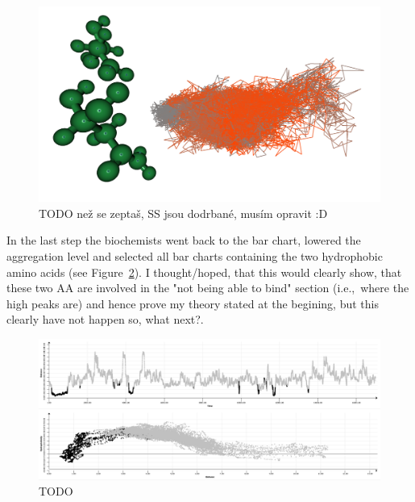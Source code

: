 \documentclass[twocolumn]{bmcart}%
\newcommand{\ie}{i.e.,~}
\begin{document}
\begin{figure}[htb]
	\centering
  \includegraphics[width=0.95\linewidth]{img/case_hydro_vs_dist_3d.png}
  \caption{\label{fig:case_hydro_vs_dist_3d} {\color{red}TODO} než se zeptaš, SS jsou dodrbané, musím opravit :D}
\end{figure}

In the last step the biochemists went back to the bar chart, lowered the aggregation level and selected all bar charts containing the two hydrophobic amino acids (see Figure~\ref{fig:case_hydro_vs_dist_residues_selected}). 
{\color{red}} I thought/hoped, that this would clearly show, that these two AA are involved in the "not being able to bind" section (\ie where the high peaks are) and hence prove my theory stated at the begining, but this clearly have not  happen so, what next?.

\begin{figure}[htb]
	\centering
  \includegraphics[width=0.95\linewidth]{img/case_hydro_vs_dist_residues_selected.png}
  \caption{\label{fig:case_hydro_vs_dist_residues_selected} {\color{red}TODO}}
\end{figure}



\end{document}
